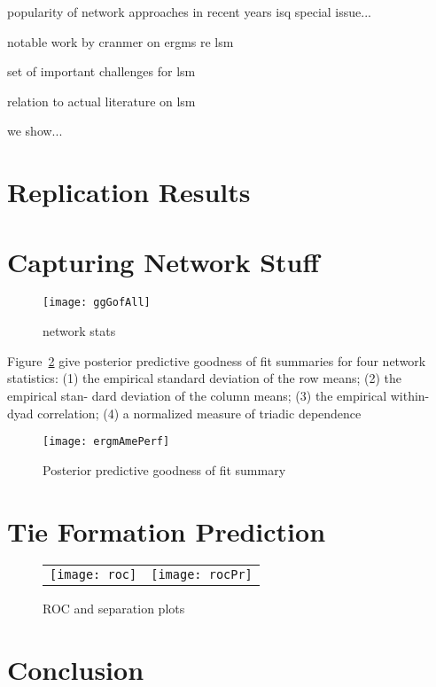 popularity of network approaches in recent years isq special issue...

notable work by cranmer on ergms re lsm

set of important challenges for lsm

relation to actual literature on lsm

we show...

\section{Replication Results}



\section{Capturing Network Stuff}

\begin{figure}[ht]
	\centering
	\texttt{[image: ggGofAll]}
	\caption{network stats }
	\label{fig:gofAll}
\end{figure}

Figure~\ref{fig:ergmAmePerf} give posterior predictive goodness of fit summaries for four network statistics: (1) the empirical standard deviation of the row means; (2) the empirical stan- dard deviation of the column means; (3) the empirical within-dyad correlation; (4) a normalized measure of triadic dependence

\begin{figure}[ht]
	\centering
	\texttt{[image: ergmAmePerf]}
	\caption{Posterior predictive goodness of fit summary}
	\label{fig:ergmAmePerf}
\end{figure}

\section{Tie Formation Prediction}



\begin{figure}[ht]
	\centering
	\begin{tabular}{cc}
	\texttt{[image: roc]} & 
	\texttt{[image: rocPr]}	
	\end{tabular}
	\caption{ROC and separation plots}
	\label{fig:roc}
\end{figure}

\section{Conclusion}


